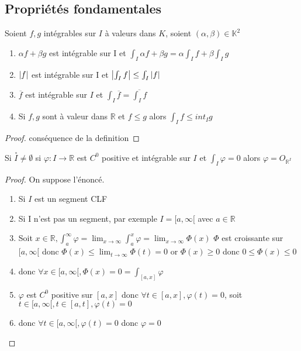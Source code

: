 \documentclass[11pt,hidelinks]{book}
\theoremstyle{mytheoremstyle}
\theoremstyle{mytheoremstyle}
\theoremstyle{mytheoremstyle}
\theoremstyle{mytheoremstyle}
\theoremstyle{mytheoremstyle}
\theoremstyle{mytheoremstyle}
\theoremstyle{mytheoremstyle}
\theoremstyle{mytheoremstyle}
\theoremstyle{myproblemstyle}
\def\mbb#1{\mathbb{#1}}
\def\bR{\mbb{R}}
\def\bK{\mbb{K}}
\def\af{[a,\infty[}
\newcommand{\func}[3]{#1\colon#2\to#3}
\begin{document}
\begin{adjustwidth}{-2em}{-1em}
\end{adjustwidth}
\subsection{Propriétés fondamentales}
\begin{adjustwidth}{-2em}{-1em}
    \begin{theorem}
        Soient $f,g$ intégrables sur $I$ à valeurs dans $K$, soient $(\alpha,\beta) \in \bK^2$
        \begin{enumerate}
            \item $\alpha f + \beta g$ est intégrable  sur I et $\int_I \alpha f + \beta g = \alpha \int_I f + \beta \int_I g$
            \item $\abs{f}$ est intégrable sur I et $\abs{\int_I f} \leq \int_I \abs{f}$
            \item $\overline{f}$ est intégrable sur $I$ et $\int_I \overline{f} = \overline{\int_I f}$
            \item Si $f,g$ sont à valeur dans $\bR$ et $f \leq g$ alors $\int_I f \leq int_I g$
        \end{enumerate}
        \begin{proof}
            conséquence de la definition
        \end{proof}
    \end{theorem}

    \begin{theorem}
        Si $\overset{\circ}{I} \not= \emptyset$ si $\func{\varphi}{I}{\bR}$ est $C^0$ positive et intégrable 
        sur $I$ et $\int_{I} \varphi = 0$ alors $\varphi = O_{\bR^I}$
        \begin{proof}
            On suppose l'énoncé. 
            \begin{enumerate}[label=$\cdot$]
                \item Si $I$ est un segment CLF
                \item Si I n'est pas un segment, par exemple $I = \af$ avec $a \in \bR$ 
                \item Soit $x \in \bR, \int_{a}^{\infty} \varphi = \lim_{x \to \infty} \int_{a}^{x} \varphi = \lim_{x \to \infty} \Phi(x)$
                $\Phi$ est croissante sur $\af$ donc $\Phi(x) \leq \lim_{t \to \infty} \Phi(t) = 0$ 
                or $\Phi(x) \geq 0$ donc $0 \leq \Phi(x) \leq 0$ 
                \item donc $\forall x \in \af, \Phi(x) = 0 = \int_{[a,x]} \varphi$
                \item $\varphi$ est $C^0$ positive sur $[a,x]$ donc $\forall t \in [a,x], \varphi(t) = 0$, soit $t \in \af, t\in[a,t],\varphi(t)=0$
                \item donc $\forall t \in \af, \varphi(t) = 0$ donc $\varphi = 0$
            \end{enumerate}
        \end{proof}
    \end{theorem}


\end{adjustwidth}
\end{document}
